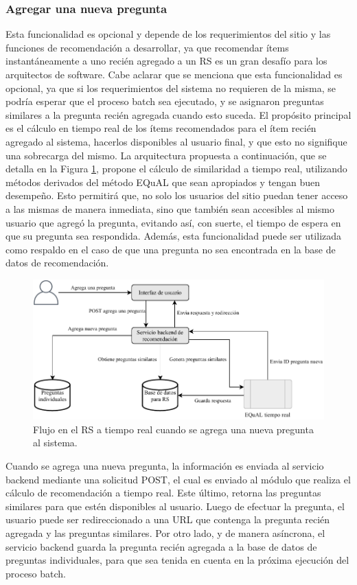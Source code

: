 \subsubsection{Agregar una nueva pregunta}
Esta funcionalidad es opcional y depende de los requerimientos del sitio y las funciones de recomendación a desarrollar, ya que recomendar ítems instantáneamente a uno recién agregado a un RS es un gran desafío para los arquitectos de software. Cabe aclarar que se menciona que esta funcionalidad es opcional, ya que si los requerimientos del sistema no requieren de la misma, se podría esperar que el proceso batch sea ejecutado, y se asignaron preguntas similares a la pregunta recién agregada cuando esto suceda. El propósito principal es el cálculo en tiempo real de los ítems recomendados para el ítem recién agregado al sistema, hacerlos disponibles al usuario final, y que esto no signifique una sobrecarga del mismo. La arquitectura propuesta a continuación, que se detalla en la Figura \ref{fig:implementacionrsagregar}, propone el cálculo de similaridad a tiempo real, utilizando métodos derivados del método EQuAL que sean apropiados y tengan buen desempeño. Esto permitirá que, no solo los usuarios del sitio puedan tener acceso a las mismas de manera inmediata, sino que también sean accesibles al mismo usuario que agregó la pregunta, evitando así, con suerte, el tiempo de espera en que su pregunta sea respondida. Además, esta funcionalidad puede ser utilizada como respaldo en el caso de que una pregunta no sea encontrada en la base de datos de recomendación.

\begin{figure}[h!]
	\centering
	\includegraphics[width=0.9\linewidth]{8_problema_investigacion/imagenes/implementacion_rs_agregar}
	\caption{Flujo en el RS a tiempo real cuando se agrega una nueva pregunta al sistema.}
	\label{fig:implementacionrsagregar}
\end{figure}

\bigskip Cuando se agrega una nueva pregunta, la información es enviada al servicio backend mediante una solicitud POST, el cual es enviado al módulo que realiza el cálculo de recomendación a tiempo real. Este último, retorna las preguntas similares para que estén disponibles al usuario. Luego de efectuar la pregunta, el usuario puede ser redireccionado a una URL que contenga la pregunta recién agregada y las preguntas similares. Por otro lado, y de manera asíncrona, el servicio backend guarda la pregunta recién agregada a la base de datos de preguntas individuales, para que sea tenida en cuenta en la próxima ejecución del proceso batch.

